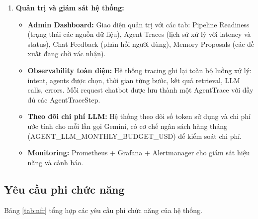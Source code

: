\begin{enumerate}
    \item \textbf{Quản trị và giám sát hệ thống:}
    \begin{itemize}
        \item \textbf{Admin Dashboard:} Giao diện quản trị với các tab: Pipeline Readiness (trạng thái các nguồn dữ liệu), Agent Traces (lịch sử xử lý với latency và status), Chat Feedback (phản hồi người dùng), Memory Proposals (các đề xuất đang chờ xác nhận).
        \item \textbf{Observability toàn diện:} Hệ thống tracing ghi lại toàn bộ luồng xử lý: intent, agents được chọn, thời gian từng bước, kết quả retrieval, LLM calls, errors. Mỗi request chatbot được lưu thành một AgentTrace với đầy đủ các AgentTraceStep.
        \item \textbf{Theo dõi chi phí LLM:} Hệ thống theo dõi số token sử dụng và chi phí ước tính cho mỗi lần gọi Gemini, có cơ chế ngân sách hàng tháng (AGENT\_LLM\_MONTHLY\_BUDGET\_USD) để kiểm soát chi phí.
        \item \textbf{Monitoring:} Prometheus + Grafana + Alertmanager cho giám sát hiệu năng và cảnh báo.
    \end{itemize}
\end{enumerate}

\subsection{Yêu cầu phi chức năng}

Bảng \ref{tab:nfr} tổng hợp các yêu cầu phi chức năng của hệ thống.

